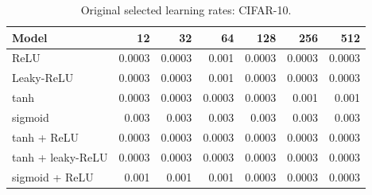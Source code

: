 \begin{table}[htbp]
\centering
\caption{Original selected learning rates: CIFAR-10.}
\label{tab:lrs:cifar10}
\footnotesize
\begin{tabular}{@{}lrrrrrr@{}}
\toprule
Model & 12 & 32 & 64 & 128 & 256 & 512 \\
\midrule
ReLU & 0.0003 & 0.0003 & 0.001 & 0.0003 & 0.0003 & 0.0003 \\
Leaky-ReLU & 0.0003 & 0.0003 & 0.001 & 0.0003 & 0.0003 & 0.0003 \\
tanh & 0.0003 & 0.0003 & 0.0003 & 0.0003 & 0.001 & 0.001 \\
sigmoid & 0.003 & 0.003 & 0.003 & 0.003 & 0.003 & 0.003 \\
tanh + ReLU & 0.0003 & 0.0003 & 0.0003 & 0.0003 & 0.0003 & 0.0003 \\
tanh + leaky-ReLU & 0.0003 & 0.0003 & 0.0003 & 0.0003 & 0.0003 & 0.0003 \\
sigmoid + ReLU & 0.001 & 0.001 & 0.001 & 0.0003 & 0.0003 & 0.0003 \\
\bottomrule
\end{tabular}
\end{table}
